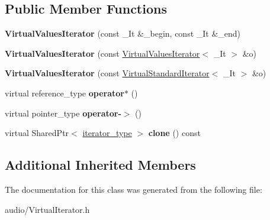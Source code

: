 \subsection*{Public Member Functions}
\begin{DoxyCompactItemize}
\item 
{\bfseries Virtual\+Values\+Iterator} (const \+\_\+\+It \&\+\_\+begin, const \+\_\+\+It \&\+\_\+end)\hypertarget{classAudio_1_1VirtualValuesIterator_a466e8591c3106ccaa2c7c4a6cab115fb}{}\label{classAudio_1_1VirtualValuesIterator_a466e8591c3106ccaa2c7c4a6cab115fb}

\item 
{\bfseries Virtual\+Values\+Iterator} (const \hyperlink{classAudio_1_1VirtualValuesIterator}{Virtual\+Values\+Iterator}$<$ \+\_\+\+It $>$ \&o)\hypertarget{classAudio_1_1VirtualValuesIterator_a46a59f5c85cfcbeac24067f59a64c898}{}\label{classAudio_1_1VirtualValuesIterator_a46a59f5c85cfcbeac24067f59a64c898}

\item 
{\bfseries Virtual\+Values\+Iterator} (const \hyperlink{classAudio_1_1VirtualStandardIterator}{Virtual\+Standard\+Iterator}$<$ \+\_\+\+It $>$ \&o)\hypertarget{classAudio_1_1VirtualValuesIterator_a956ce0d62585185721cdbfe69825130f}{}\label{classAudio_1_1VirtualValuesIterator_a956ce0d62585185721cdbfe69825130f}

\item 
virtual reference\+\_\+type {\bfseries operator$\ast$} ()\hypertarget{classAudio_1_1VirtualValuesIterator_af329dc2c04e4fc3eac0daf5ee8117994}{}\label{classAudio_1_1VirtualValuesIterator_af329dc2c04e4fc3eac0daf5ee8117994}

\item 
virtual pointer\+\_\+type {\bfseries operator-\/$>$} ()\hypertarget{classAudio_1_1VirtualValuesIterator_a71668873a746685687882a8bef034a4e}{}\label{classAudio_1_1VirtualValuesIterator_a71668873a746685687882a8bef034a4e}

\item 
virtual Shared\+Ptr$<$ \hyperlink{classAudio_1_1VirtualIterator}{iterator\+\_\+type} $>$ {\bfseries clone} () const \hypertarget{classAudio_1_1VirtualValuesIterator_a5eb697b0964e59b0bf596683f59b2753}{}\label{classAudio_1_1VirtualValuesIterator_a5eb697b0964e59b0bf596683f59b2753}

\end{DoxyCompactItemize}
\subsection*{Additional Inherited Members}


The documentation for this class was generated from the following file\+:\begin{DoxyCompactItemize}
\item 
audio/Virtual\+Iterator.\+h\end{DoxyCompactItemize}
